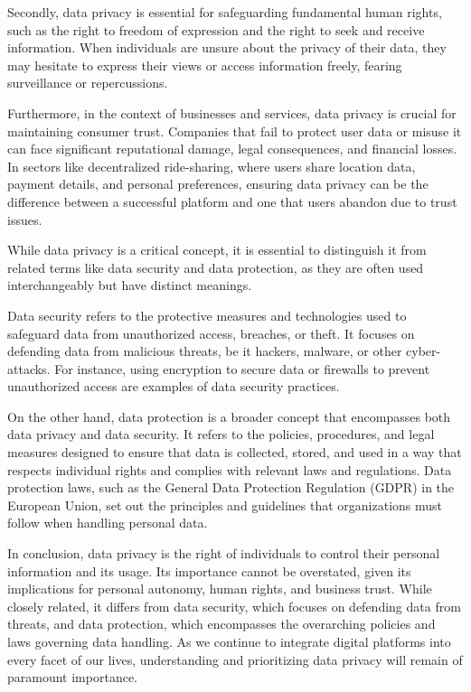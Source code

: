 Secondly, data privacy is essential for safeguarding fundamental human rights, such as the right to freedom of expression and the right to seek and receive information. When individuals are unsure about the privacy of their data, they may hesitate to express their views or access information freely, fearing surveillance or repercussions.

Furthermore, in the context of businesses and services, data privacy is crucial for maintaining consumer trust. Companies that fail to protect user data or misuse it can face significant reputational damage, legal consequences, and financial losses. In sectors like decentralized ride-sharing, where users share location data, payment details, and personal preferences, ensuring data privacy can be the difference between a successful platform and one that users abandon due to trust issues.

While data privacy is a critical concept, it is essential to distinguish it from related terms like data security and data protection, as they are often used interchangeably but have distinct meanings.

Data security refers to the protective measures and technologies used to safeguard data from unauthorized access, breaches, or theft. It focuses on defending data from malicious threats, be it hackers, malware, or other cyber-attacks. For instance, using encryption to secure data or firewalls to prevent unauthorized access are examples of data security practices.

On the other hand, data protection is a broader concept that encompasses both data privacy and data security. It refers to the policies, procedures, and legal measures designed to ensure that data is collected, stored, and used in a way that respects individual rights and complies with relevant laws and regulations. Data protection laws, such as the General Data Protection Regulation (GDPR) in the European Union, set out the principles and guidelines that organizations must follow when handling personal data.

In conclusion, data privacy is the right of individuals to control their personal information and its usage. Its importance cannot be overstated, given its implications for personal autonomy, human rights, and business trust. While closely related, it differs from data security, which focuses on defending data from threats, and data protection, which encompasses the overarching policies and laws governing data handling. As we continue to integrate digital platforms into every facet of our lives, understanding and prioritizing data privacy will remain of paramount importance.
